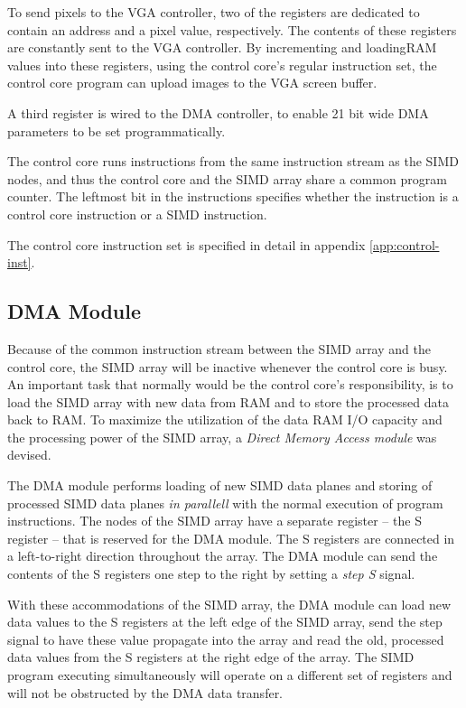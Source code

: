 

To send pixels to the \ac{VGA} controller, two of the registers are dedicated to
contain an address and a pixel value, respectively. The contents of these
registers are constantly sent to the \ac{VGA} controller. By incrementing and
loading\ac{RAM} values into these registers, using the control core's regular
instruction set, the control core program can upload images to the \ac{VGA}
screen buffer.

A third register is wired to the \ac{DMA} controller, to enable 21 bit wide
\ac{DMA} parameters to be set programmatically.

The control core runs instructions from the same instruction stream as the
\ac{SIMD} nodes, and thus the control core and the \ac{SIMD} array share a
common program counter. The leftmost bit in the instructions specifies whether
the instruction is a control core instruction or a \ac{SIMD} instruction.

The control core instruction set is specified in detail in appendix
\ref{app:control-inst}.

\subsection{DMA Module}

Because of the common instruction stream between the \ac{SIMD} array and the
control core, the \ac{SIMD} array will be inactive whenever the control core is
busy. An important task that normally would be the control core's
responsibility, is to load the \ac{SIMD} array with new data from \ac{RAM} and
to store the processed data back to \ac{RAM}. To maximize the utilization of the
data \ac{RAM} \ac{I/O} capacity and the processing power of the \ac{SIMD} array,
a \emph{Direct Memory Access module} was devised.

The \ac{DMA} module performs loading of new \ac{SIMD} data planes and storing of
processed \ac{SIMD} data planes \emph{in parallell} with the normal execution
of program instructions. The nodes of the \ac{SIMD} array have a separate
register -- the S register -- that is reserved for the \ac{DMA} module. The S
registers are connected in a left-to-right direction throughout the
array. The \ac{DMA} module can send the contents of the S registers one step
to the right by setting a \emph{step S} signal.

With these accommodations of the \ac{SIMD} array, the \ac{DMA} module can load
new data values to the S registers at the left edge of the \ac{SIMD} array, send
the step signal to have these value propagate into the array and read the old,
processed data values from the S registers at the right edge of the array. The
\ac{SIMD} program executing simultaneously will operate on a different set of
registers and will not be obstructed by the \ac{DMA} data transfer.

